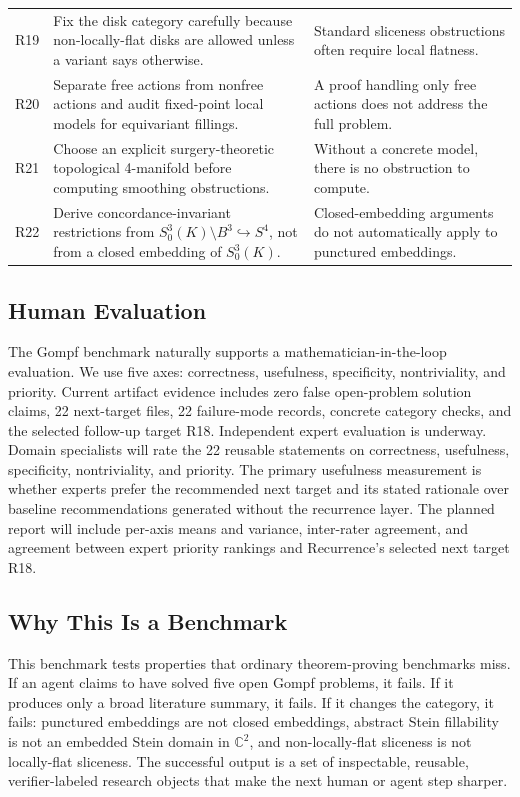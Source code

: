 \documentclass{article}
\theoremstyle{definition}
\theoremstyle{remark}
\begin{document}
\begin{table}[t]
\begin{scriptsize}
\begin{tabular}{p{}p{}p{}}
    R19 & Fix the disk category carefully because non-locally-flat disks are allowed unless a variant says otherwise. & Standard sliceness obstructions often require local flatness. \\
    R20 & Separate free actions from nonfree actions and audit fixed-point local models for equivariant fillings. & A proof handling only free actions does not address the full problem. \\
    R21 & Choose an explicit surgery-theoretic topological 4-manifold before computing smoothing obstructions. & Without a concrete model, there is no obstruction to compute. \\
    R22 & Derive concordance-invariant restrictions from \(S^3_0(K)\setminus B^3\hookrightarrow S^4\), not from a closed embedding of \(S^3_0(K)\). & Closed-embedding arguments do not automatically apply to punctured embeddings. \\
    \bottomrule
  \end{tabular}
  \end{scriptsize}
\end{table}

\subsection{Human Evaluation}

The Gompf benchmark naturally supports a mathematician-in-the-loop evaluation. We use five axes: correctness, usefulness, specificity, nontriviality, and priority. Current artifact evidence includes zero false open-problem solution claims, 22 next-target files, 22 failure-mode records, concrete category checks, and the selected follow-up target R18. Independent expert evaluation is underway. Domain specialists will rate the 22 reusable statements on correctness, usefulness, specificity, nontriviality, and priority. The primary usefulness measurement is whether experts prefer the recommended next target and its stated rationale over baseline recommendations generated without the recurrence layer. The planned report will include per-axis means and variance, inter-rater agreement, and agreement between expert priority rankings and Recurrence's selected next target R18.

\subsection{Why This Is a Benchmark}

This benchmark tests properties that ordinary theorem-proving benchmarks miss. If an agent claims to have solved five open Gompf problems, it fails. If it produces only a broad literature summary, it fails. If it changes the category, it fails: punctured embeddings are not closed embeddings, abstract Stein fillability is not an embedded Stein domain in \(\mathbb{C}^2\), and non-locally-flat sliceness is not locally-flat sliceness. The successful output is a set of inspectable, reusable, verifier-labeled research objects that make the next human or agent step sharper.
\end{document}
